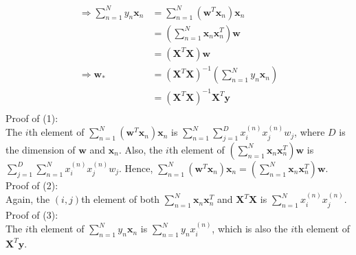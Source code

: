 \documentclass{article}
\newcommand{\mathbi}[1]{\boldsymbol{#1}}
\begin{document}
\begin{itemize}
\begin{itemize}
\begin{align*}
        \Rightarrow \sum_{n=1}^{N} y_n \mathbi{x}_n &= \sum_{n=1}^{N} (\mathbi{w}^T \mathbi{x}_n) \mathbi{x}_n \\
        &= \left( \sum_{n=1}^{N} \mathbi{x}_n \mathbi{x}_n^T \right) \mathbi{w} \tag{1} \\
        &= (\mathbi{X}^T \mathbi{X}) \mathbi{w} \tag{2} \\
        \Rightarrow \mathbi{w}_* &= (\mathbi{X}^T \mathbi{X})^{-1} \left( \sum_{n=1}^{N} y_n \mathbi{x}_n \right) \\
        &= (\mathbi{X}^T \mathbi{X})^{-1} \mathbi{X}^T \mathbi{y} \tag{3} \\
      \end{align*}
      Proof of (1): \\
      The $i$th element of $\sum_{n=1}^{N} (\mathbi{w}^T \mathbi{x}_n) \mathbi{x}_n$ is $\sum_{n=1}^{N} \sum_{j=1}^{D} x_i^{(n)} x_j^{(n)} w_j$, where $D$ is the dimension of $\mathbi{w}$ and $\mathbi{x}_n$.
      Also, the $i$th element of $\left( \sum_{n=1}^{N} \mathbi{x}_n \mathbi{x}_n^T \right) \mathbi{w}$ is $\sum_{j=1}^{D} \sum_{n=1}^{N} x_i^{(n)} x_j^{(n)} w_j$.
      Hence, $\sum_{n=1}^{N} (\mathbi{w}^T \mathbi{x}_n) \mathbi{x}_n = \left( \sum_{n=1}^{N} \mathbi{x}_n \mathbi{x}_n^T \right) \mathbi{w}$. \\
      Proof of (2): \\
      Again, the $(i, j)$th element of both $\sum_{n=1}^{N} \mathbi{x}_n \mathbi{x}_n^T$ and $\mathbi{X}^T \mathbi{X}$ is $\sum_{n=1}^{N} x_i^{(n)} x_j^{(n)}$. \\
      Proof of (3): \\
      The $i$th element of $\sum_{n=1}^{N} y_n \mathbi{x}_n$ is $\sum_{n=1}^{N} y_n x_i^{(n)}$, which is also the $i$th element of $\mathbi{X}^T \mathbi{y}$.


\end{itemize}
\end{itemize}
\end{document}
